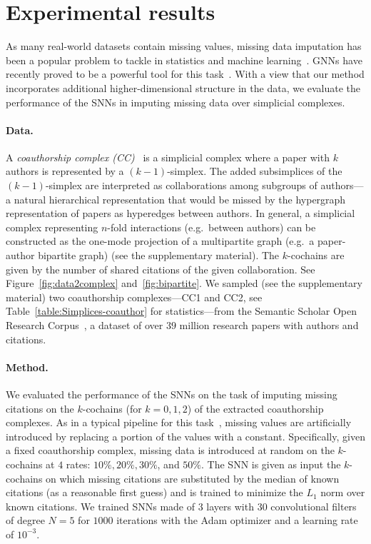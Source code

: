 \section{Experimental results}

As many real-world datasets contain missing values, missing data imputation has been a popular problem to tackle in statistics and machine learning~\cite{little1986statistical, nelwamondo2007missing}.
GNNs have recently proved to be a powerful tool for this task~\cite{spinelli2020neural}.
With a view that our method incorporates additional higher-dimensional structure in the data, we evaluate the performance of the SNNs in imputing missing data over simplicial complexes.

\paragraph{Data.}
A \emph{coauthorship complex (CC)}~\cite{patania2017} is a simplicial complex where a paper with $k$ authors is represented by a $(k-1)$-simplex.
The added subsimplices of the $(k-1)$-simplex are interpreted as collaborations among subgroups of authors---a natural hierarchical representation that would be missed by the hypergraph representation of papers as hyperedges between authors.
In general, a simplicial complex representing $n$-fold interactions (e.g.\ between authors) can be constructed as the one-mode projection of a multipartite graph (e.g.\ a paper-author bipartite graph) (see the supplementary material).
The $k$-cochains are given by the number of shared citations of the given collaboration.
See Figure~\ref{fig:data2complex} and~\ref{fig:bipartite}.
We sampled (see the supplementary material) two coauthorship complexes---CC1 and CC2, see Table~\ref{table:Simplices-coauthor} for statistics---from the Semantic Scholar Open Research Corpus~\cite{ammar18NAACL}, a dataset of over $39$ million research papers with authors and citations.

\paragraph{Method.}
We evaluated the performance of the SNNs on the task of imputing missing citations on the $k$-cochains (for $k=0,1,2$) of the extracted coauthorship complexes.
As in a typical pipeline for this task~\cite{nelwamondo2007missing}, missing values are artificially introduced by replacing a portion of the values with a constant.
Specifically, given a fixed coauthorship complex, missing data is introduced at random on the $k$-cochains at $4$ rates: $10\%, 20\%,  30\%$, and $50\%$.
The SNN is given as input the $k$-cochains on which missing citations are substituted by the median of known citations (as a reasonable first guess) and is trained to minimize the $L_1$ norm over known citations.
We trained SNNs made of $3$ layers with $30$ convolutional filters of degree $N=5$ for $1000$ iterations with the Adam optimizer and a learning rate of $10^{-3}$.

